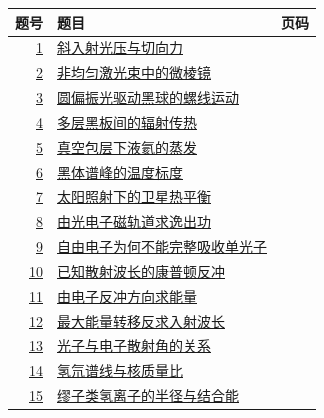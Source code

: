 \documentclass[UTF8,fontset=fandol,a4paper,11pt]{ctexart}
\begin{document}
\begin{longtable}{@{}r p{113mm} r@{}}\toprule 题号 & 题目 & 页码\\\midrule

\hyperref[q:1]{1} & \hyperref[q:1]{斜入射光压与切向力} & \pageref{q:1} \\

\hyperref[q:2]{2} & \hyperref[q:2]{非均匀激光束中的微棱镜} & \pageref{q:2} \\

\hyperref[q:3]{3} & \hyperref[q:3]{圆偏振光驱动黑球的螺线运动} & \pageref{q:3} \\

\hyperref[q:4]{4} & \hyperref[q:4]{多层黑板间的辐射传热} & \pageref{q:4} \\

\hyperref[q:5]{5} & \hyperref[q:5]{真空包层下液氦的蒸发} & \pageref{q:5} \\

\hyperref[q:6]{6} & \hyperref[q:6]{黑体谱峰的温度标度} & \pageref{q:6} \\

\hyperref[q:7]{7} & \hyperref[q:7]{太阳照射下的卫星热平衡} & \pageref{q:7} \\

\hyperref[q:8]{8} & \hyperref[q:8]{由光电子磁轨道求逸出功} & \pageref{q:8} \\

\hyperref[q:9]{9} & \hyperref[q:9]{自由电子为何不能完整吸收单光子} & \pageref{q:9} \\

\hyperref[q:10]{10} & \hyperref[q:10]{已知散射波长的康普顿反冲} & \pageref{q:10} \\

\hyperref[q:11]{11} & \hyperref[q:11]{由电子反冲方向求能量} & \pageref{q:11} \\

\hyperref[q:12]{12} & \hyperref[q:12]{最大能量转移反求入射波长} & \pageref{q:12} \\

\hyperref[q:13]{13} & \hyperref[q:13]{光子与电子散射角的关系} & \pageref{q:13} \\

\hyperref[q:14]{14} & \hyperref[q:14]{氢氘谱线与核质量比} & \pageref{q:14} \\

\hyperref[q:15]{15} & \hyperref[q:15]{缪子类氢离子的半径与结合能} & \pageref{q:15} \\


\end{longtable}
\end{document}
